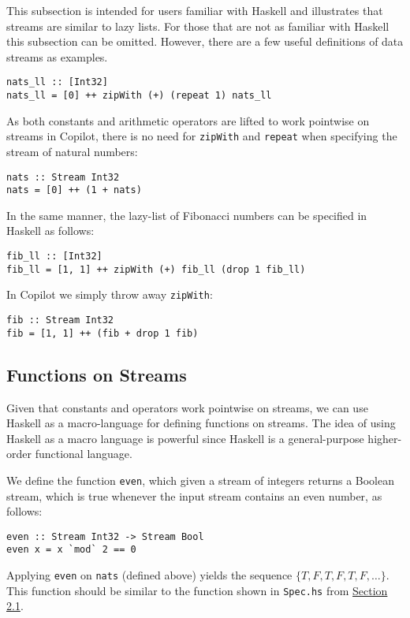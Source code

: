This subsection is intended for users familiar with Haskell and illustrates that streams
 are similar to  lazy lists.
%
For those that are not as familiar with Haskell this
subsection can be omitted.
%
However, there are a few useful definitions of data
streams as examples.
%
\begin{lstlisting}[language = Copilot, frame = single]
nats_ll :: [Int32]
nats_ll = [0] ++ zipWith (+) (repeat 1) nats_ll
\end{lstlisting}
%
As both constants and arithmetic operators are lifted to work pointwise on
streams in Copilot, there is no need for {\tt zipWith} and {\tt repeat} when
specifying the stream of natural numbers:
%
\begin{lstlisting}[language = Copilot, frame = single]
nats :: Stream Int32
nats = [0] ++ (1 + nats)
\end{lstlisting}
%
In the same manner, the lazy-list of Fibonacci numbers can be specified  in Haskell as follows:
%
\begin{lstlisting}[language = Copilot, frame = single]
fib_ll :: [Int32]
fib_ll = [1, 1] ++ zipWith (+) fib_ll (drop 1 fib_ll)
\end{lstlisting}
%
In Copilot we simply throw away {\tt zipWith}:
\begin{lstlisting}[language = Copilot, frame = single]
fib :: Stream Int32
fib = [1, 1] ++ (fib + drop 1 fib)
\end{lstlisting}

\subsection{Functions on Streams} \label{sec:FnOnStreams}

Given that constants and operators work pointwise on streams, we can use
Haskell as a macro-language for defining functions on streams.
%
The idea of using Haskell as a macro language is powerful since Haskell is a
general-purpose higher-order functional language.

\begin{example}
We define the function {\tt even}, which given a stream of integers returns a
Boolean stream, which is true whenever the input stream contains an even number,
as follows:
%
\begin{lstlisting}[language = Copilot, frame = single]
even :: Stream Int32 -> Stream Bool
even x = x `mod` 2 == 0
\end{lstlisting}
%
Applying {\tt even} on {\tt nats} (defined above) yields the sequence
$\{T, F, T, F, T, F, \dots\}$.
%
This function should be similar to the function shown in {\tt Spec.hs} from
\hyperref[interpcompile]{Section 2.1}.
\end{example}

